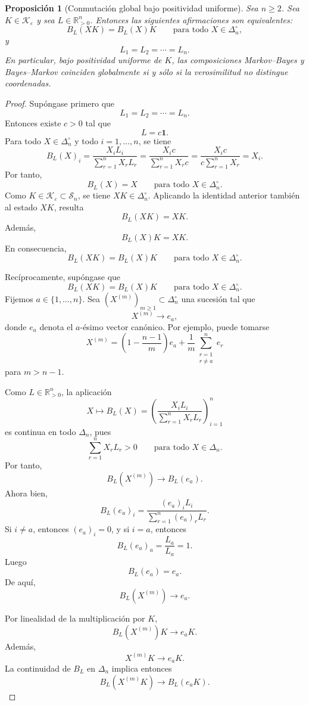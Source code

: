 \documentclass[12pt]{article}
\newtheorem{proposicion}{Proposición}[section]
\begin{document}
\begin{proposicion}[Conmutación global bajo positividad uniforme]
\label{prop:conmutacion_global_MB_BM}
Sea \(n\ge 2\). Sea \(K\in\mathcal K_\varepsilon\) y sea \(L\in\mathbb R_{>0}^n\). Entonces las siguientes afirmaciones son equivalentes:
\[
B_L(XK)=B_L(X)K
\qquad
\text{para todo }X\in\Delta_n^\circ,
\]
y
\[
L_1=L_2=\cdots=L_n.
\]
En particular, bajo positividad uniforme de \(K\), las composiciones Markov--Bayes y Bayes--Markov coinciden globalmente si y sólo si la verosimilitud no distingue coordenadas.
\end{proposicion}

\begin{proof}
Supóngase primero que
\[
L_1=L_2=\cdots=L_n.
\]
Entonces existe \(c>0\) tal que
\[
L=c\mathbf 1.
\]
Para todo \(X\in\Delta_n^\circ\) y todo \(i=1,\dots,n\), se tiene
\[
B_L(X)_i
=
\frac{X_iL_i}{\sum_{r=1}^nX_rL_r}
=
\frac{X_ic}{\sum_{r=1}^nX_rc}
=
\frac{X_ic}{c\sum_{r=1}^nX_r}
=
X_i.
\]
Por tanto,
\[
B_L(X)=X
\qquad
\text{para todo }X\in\Delta_n^\circ.
\]
Como \(K\in\mathcal K_\varepsilon\subset\mathcal S_n\), se tiene \(XK\in\Delta_n^\circ\). Aplicando la identidad anterior también al estado \(XK\), resulta
\[
B_L(XK)=XK.
\]
Además,
\[
B_L(X)K=XK.
\]
En consecuencia,
\[
B_L(XK)=B_L(X)K
\qquad
\text{para todo }X\in\Delta_n^\circ.
\]

Recíprocamente, supóngase que
\[
B_L(XK)=B_L(X)K
\qquad
\text{para todo }X\in\Delta_n^\circ.
\]
Fijemos \(a\in\{1,\dots,n\}\). Sea \((X^{(m)})_{m\ge1}\subset\Delta_n^\circ\) una sucesión tal que
\[
X^{(m)}\longrightarrow e_a,
\]
donde \(e_a\) denota el \(a\)-ésimo vector canónico. Por ejemplo, puede tomarse
\[
X^{(m)}
=
\left(1-\frac{n-1}{m}\right)e_a
+
\frac{1}{m}\sum_{\substack{r=1\\ r\ne a}}^n e_r
\]
para \(m>n-1\).

Como \(L\in\mathbb R_{>0}^n\), la aplicación
\[
X\longmapsto B_L(X)
=
\left(
\frac{X_iL_i}{\sum_{r=1}^nX_rL_r}
\right)_{i=1}^n
\]
es continua en todo \(\Delta_n\), pues
\[
\sum_{r=1}^nX_rL_r>0
\qquad
\text{para todo }X\in\Delta_n.
\]
Por tanto,
\[
B_L(X^{(m)})\longrightarrow B_L(e_a).
\]
Ahora bien,
\[
B_L(e_a)_i
=
\frac{(e_a)_iL_i}{\sum_{r=1}^n(e_a)_rL_r}.
\]
Si \(i\ne a\), entonces \((e_a)_i=0\), y si \(i=a\), entonces
\[
B_L(e_a)_a
=
\frac{L_a}{L_a}
=
1.
\]
Luego
\[
B_L(e_a)=e_a.
\]
De aquí,
\[
B_L(X^{(m)})\longrightarrow e_a.
\]

Por linealidad de la multiplicación por \(K\),
\[
B_L(X^{(m)})K\longrightarrow e_aK.
\]
Además,
\[
X^{(m)}K\longrightarrow e_aK.
\]
La continuidad de \(B_L\) en \(\Delta_n\) implica entonces
\[
B_L(X^{(m)}K)\longrightarrow B_L(e_aK).
\]


\end{proof}
\end{document}
